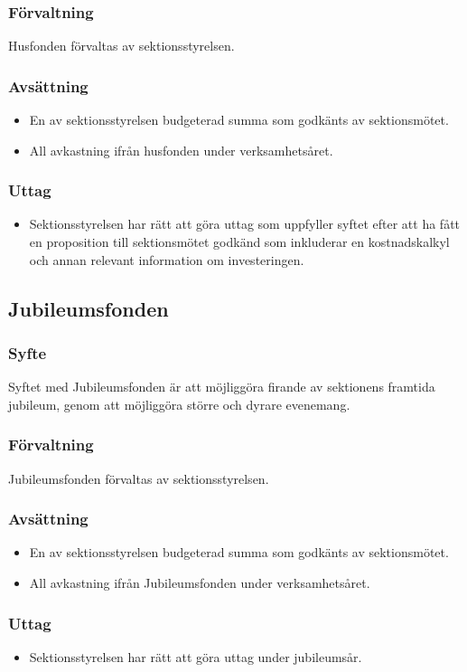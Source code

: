 \documentclass[a4paper]{dtek}
\begin{document}
\subsubsection{Förvaltning}
Husfonden förvaltas av sektionsstyrelsen.
\subsubsection{Avsättning}
\begin{itemize}
  \item En av sektionsstyrelsen budgeterad summa som godkänts av sektionsmötet.
  \item All avkastning ifrån husfonden under verksamhetsåret.
\end{itemize}
\subsubsection{Uttag}
\begin{itemize}
  \item Sektionsstyrelsen har rätt att göra uttag som uppfyller syftet efter att ha fått en proposition till sektionsmötet godkänd som inkluderar en kostnadskalkyl och annan relevant information om investeringen.
\end{itemize}
\subsection{Jubileumsfonden}
\subsubsection{Syfte}
\label{sec:jubileumfond_syfte}
Syftet med Jubileumsfonden är att möjliggöra firande av sektionens framtida jubileum, genom att möjliggöra större och dyrare evenemang.
\subsubsection{Förvaltning}
Jubileumsfonden förvaltas av sektionsstyrelsen.
\subsubsection{Avsättning}
\begin{itemize}
  \item En av sektionsstyrelsen budgeterad summa som godkänts av sektionsmötet.
  \item All avkastning ifrån Jubileumsfonden under verksamhetsåret.
\end{itemize}
\subsubsection{Uttag}
\begin{itemize}
  \item Sektionsstyrelsen har rätt att göra uttag under jubileumsår.
\end{itemize}
\end{document}
